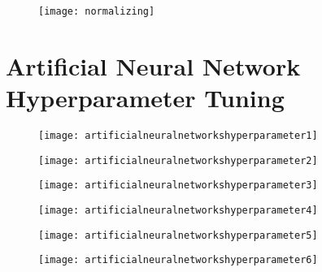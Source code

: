  	\begin{figure}[h]
		\centering
		\texttt{[image: normalizing]}
		\caption{}
		\label{fig:normalizing}
	\end{figure}

	\section{Artificial Neural Network Hyperparameter Tuning}

 	\begin{figure}[h]
		\centering
		\texttt{[image: artificialneuralnetworkshyperparameter1]}
		\caption{}
		\label{fig:artificialneuralnetworkshyperparameter1}
	\end{figure}
 	\begin{figure}[h]
		\centering
		\texttt{[image: artificialneuralnetworkshyperparameter2]}
		\caption{}
		\label{fig:artificialneuralnetworkshyperparameter2}
	\end{figure}
 	\begin{figure}[h]
		\centering
		\texttt{[image: artificialneuralnetworkshyperparameter3]}
		\caption{}
		\label{fig:artificialneuralnetworkshyperparameter3}
	\end{figure}
 	\begin{figure}[h]
		\centering
		\texttt{[image: artificialneuralnetworkshyperparameter4]}
		\caption{}
		\label{fig:artificialneuralnetworkshyperparameter4}
	\end{figure}
 	\begin{figure}[h]
		\centering
		\texttt{[image: artificialneuralnetworkshyperparameter5]}
		\caption{}
		\label{fig:artificialneuralnetworkshyperparameter5}
	\end{figure}
 	\begin{figure}[h]
		\centering
		\texttt{[image: artificialneuralnetworkshyperparameter6]}
		\caption{}
		\label{fig:artificialneuralnetworkshyperparameter6}
	\end{figure} 